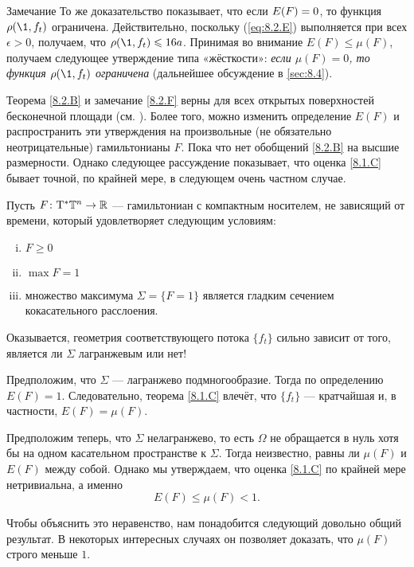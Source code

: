 \begin{ex}{Замечание}\label{8.2.F}
То же доказательство показывает, что если $E (F) \z= 0$, то функция
$\rho (\1, f_t)$ ограничена. 
Действительно, поскольку (\ref{eq:8.2.E}) выполняется при всех
$\epsilon> 0$, получаем, что $\rho (\1, f_t) \z\le 16a$. 
Принимая во внимание $E (F) \le \mu (F)$, получаем следующее
утверждение типа «жёсткости»: \textit{если $\mu (F) = 0$, то функция $\rho
(\1, f_t)$ ограничена} (дальнейшее обсуждение в \ref{sec:8.4}). 
\end{ex}

Теорема \ref{8.2.B} и замечание \ref{8.2.F} верны для всех открытых
поверхностей бесконечной площади (см. \cite{PS}). 
Более того, можно изменить определение $E (F)$ и распространить эти
утверждения на произвольные (не обязательно неотрицательные)
гамильтонианы $F$. 
Пока что нет обобщений \ref{8.2.B} на высшие размерности.
Однако следующее рассуждение показывает, что оценка \ref{8.1.C} бывает точной,
по крайней мере, в следующем очень частном случае. 

Пусть $F\colon \mathrm{T}^\ast \mathbb{T}^n \to \mathbb{R}$ — гамильтониан с компактным носителем, не зависящий от времени, который удовлетворяет следующим условиям: 
\begin{enumerate}[(i)]
\item $F \ge 0 $
\item $\max F = 1$ 
\item множество максимума $\Sigma =\{F = 1\}$ является гладким сечением кокасательного расслоения. 
\end{enumerate}

Оказывается, геометрия соответствующего потока $\{f_t\}$ сильно
зависит от того, является ли $\Sigma$ лагранжевым или нет! 

Предположим, что $\Sigma$ — лагранжево подмногообразие.
Тогда по определению $E (F) = 1$.
Следовательно, теорема \ref{8.1.C} влечёт, что $\{f_t\}$ —
кратчайшая и, в частности, $E (F) = \mu (F)$. 

Предположим теперь, что $\Sigma$ нелагранжево, то есть $\Omega$ не
обращается в нуль хотя бы на одном касательном пространстве к
$\Sigma$. 
Тогда неизвестно, равны ли $\mu (F)$ и $E (F)$ между собой.
Однако мы утверждаем, что оценка \ref{8.1.C} по крайней мере
нетривиальна, а именно  
\begin{equation}
E (F) \le \mu (F) <1.\label{8.2.G}
\end{equation}

Чтобы объяснить это неравенство, нам понадобится следующий довольно общий результат.
В некоторых интересных случаях он позволяет доказать, что $\mu(F)$ строго меньше $1$. 

